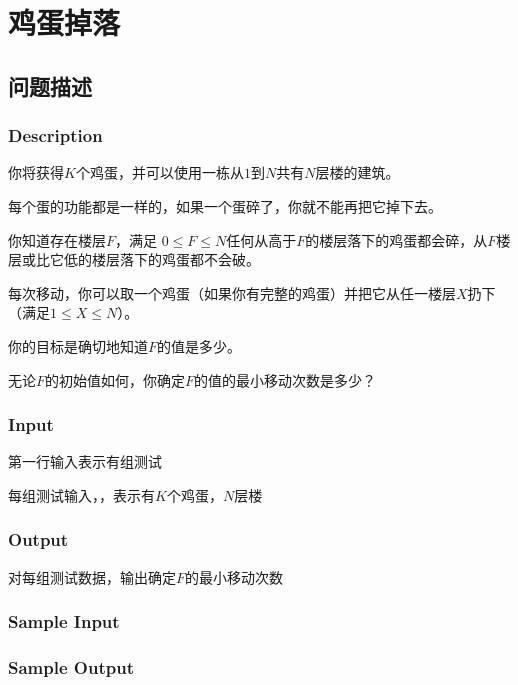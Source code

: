 \newpage\quad\newpage
\section{鸡蛋掉落}
\subsection{问题描述}
\subsubsection*{Description}
你将获得$K$个鸡蛋，并可以使用一栋从$1$到$N$共有$N$层楼的建筑。

每个蛋的功能都是一样的，如果一个蛋碎了，你就不能再把它掉下去。

你知道存在楼层$F$，满足 $0\leq F\leq N$任何从高于$F$的楼层落下的鸡蛋都会碎，从$F$楼层或比它低的楼层落下的鸡蛋都不会破。

每次移动，你可以取一个鸡蛋（如果你有完整的鸡蛋）并把它从任一楼层$X$扔下（满足$1\leq X\leq N$）。

你的目标是确切地知道$F$的值是多少。

无论$F$的初始值如何，你确定$F$的值的最小移动次数是多少？

\subsubsection*{Input}

第一行输入表示有组测试

每组测试输入，，表示有$K$个鸡蛋，$N$层楼

\subsubsection*{Output}

对每组测试数据，输出确定$F$的最小移动次数

\subsubsection*{Sample Input}





\subsubsection*{Sample Output}

